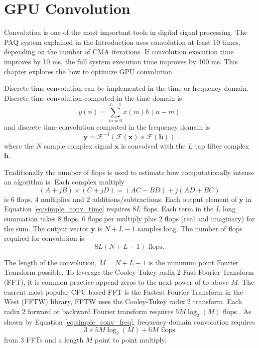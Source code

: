 \section{GPU Convolution}
\label{chap:gpu_convolution}
Convolution is one of the most important tools in digital signal processing.
The PAQ system explained in the Introduction uses convolution at least 10 times, depending on the number of CMA iterations.
If convolution execution time improves by 10 ms, the full system execution time improves by 100 ms.
This chapter explores the how to optimize GPU convolution.

Discrete time convolution can be implemented in the time or frequency domain. 
Discrete time convolution computed in the time domain is
\begin{equation}
y(n) = \sum^{L-1}_{m=0} x(m) h(n-m)
  \label{eq:simple_conv_time}
\end{equation}
and discrete time convolution computed in the frequency domain is
\begin{equation}
\mathbf{y} = \mathscr{F}^{-1}(\mathscr{F}(\mathbf{x})\times\mathscr{F}(\mathbf{h}))
  \label{eq:simple_conv_freq}
\end{equation}
where the $N$ sample complex signal $\mathbf{x}$ is convolved with the $L$ tap filter complex $\mathbf{h}$.

Traditionally the number of flops is used to estimate how computationally intense an algorithm is. 
Each complex multiply 
\begin{equation}
(A+jB)\times(C+jD) = (AC-BD)+j(AD+BC)
\end{equation}
is $6$ flops, $4$ multiplies and $2$ additions/subtractions.
Each output element of $\mathbf{y}$ in Equation \eqref{eq:simple_conv_time} requires $8L$ flops.
Each term in the $L$ long summation takes $8$ flops, $6$ flops per multiply plus $2$ flops (real and imaginary)  for the sum.
The output vector $\mathbf{y}$ is $N+L-1$ samples long.
The number of flops required for convolution is
\begin{equation}
8L(N+L-1) \text{ flops}.
\label{eq:flops_time_domain_conv}
\end{equation}

The length of the convolution, $M=N+L-1$ is the minimum point Fourier Transform possible.
To leverage the Cooley-Tukey radix 2 Fast Fourier Transform (FFT), it is common practice append zeros to the next power of to above $M$.
The current most popular CPU based FFT is the Fastest Fourier Transform in the West (FFTW) library, FFTW uses the Cooley-Tukey radix 2 transform.
Each radix 2 forward or backward Fourier transform requires $5M\log_2(M)$ flops \cite{FFTW:2017,cooley1965algorithm}.
As shown by Equation \eqref{eq:simple_conv_freq}, frequency-domain convolution requires 
\begin{equation}
3\times5M\log_2(M)+6M \text{ flops}
\label{eq:flops_freq_domain_conv}
\end{equation}
from $3$ FFTs and a length $M$ point to point multiply.


